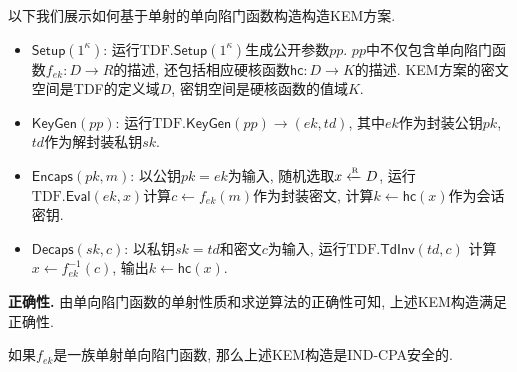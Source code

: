 以下我们展示如何基于单射的单向陷门函数构造构造KEM方案. 
\begin{construction}\label{construction:TDF-based-KEM}
\begin{itemize}
\item $\mathsf{Setup}(1^\kappa)$: 运行$\text{TDF}.\mathsf{Setup}(1^\kappa)$生成公开参数$pp$. 
	$pp$中不仅包含单向陷门函数$f_{ek}: D \rightarrow R$的描述, 
	还包括相应硬核函数$\mathsf{hc}: D \rightarrow K$的描述.  
	KEM方案的密文空间是TDF的定义域$D$, 密钥空间是硬核函数的值域$K$. 

\item $\mathsf{KeyGen}(pp)$: 运行$\text{TDF}.\mathsf{KeyGen}(pp) \rightarrow (ek, td)$, 
	其中$ek$作为封装公钥$pk$, $td$作为解封装私钥$sk$. 

\item $\mathsf{Encaps}(pk, m)$: 以公钥$pk=ek$为输入, 随机选取$x \xleftarrow{\textup{\tiny R}} D$, 
	运行$\text{TDF}.\mathsf{Eval}(ek, x)$计算$c \leftarrow f_{ek}(m)$作为封装密文, 
	计算$k \leftarrow \mathsf{hc}(x)$作为会话密钥.  

\item $\mathsf{Decaps}(sk, c)$: 以私钥$sk=td$和密文$c$为输入, 运行$\text{TDF}.\mathsf{TdInv}(td, c)$
	计算$x \leftarrow f_{ek}^{-1}(c)$, 输出$k \leftarrow \mathsf{hc}(x)$. 
\end{itemize}
\end{construction}
\begin{trivlist}
\item \textbf{正确性.} 由单向陷门函数的单射性质和求逆算法的正确性可知, 上述KEM构造满足正确性. 
\end{trivlist}

\begin{theorem}
如果$f_{ek}$是一族单射单向陷门函数, 那么上述KEM构造是IND-CPA安全的. 
\end{theorem}

